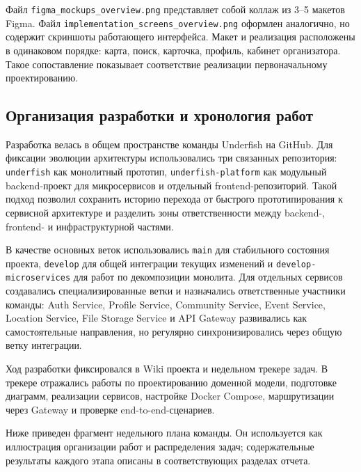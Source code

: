 Файл \nolinkurl{figma_mockups_overview.png} представляет собой коллаж из 3--5 макетов Figma. Файл \nolinkurl{implementation_screens_overview.png} оформлен аналогично, но содержит скриншоты работающего интерфейса. Макет и реализация расположены в одинаковом порядке: карта, поиск, карточка, профиль, кабинет организатора. Такое сопоставление показывает соответствие реализации первоначальному проектированию.



\subsection{Организация разработки и хронология работ}

Разработка велась в общем пространстве команды Underfish на GitHub. Для фиксации эволюции архитектуры использовались три связанных репозитория: \texttt{underfish} как монолитный прототип, \texttt{underfish-platform} как модульный backend-проект для микросервисов и отдельный frontend-репозиторий. Такой подход позволил сохранить историю перехода от быстрого прототипирования к сервисной архитектуре и разделить зоны ответственности между backend-, frontend- и инфраструктурной частями.

В качестве основных веток использовались \texttt{main} для стабильного состояния проекта, \texttt{develop} для общей интеграции текущих изменений и \texttt{develop-microservices} для работ по декомпозиции монолита. Для отдельных сервисов создавались специализированные ветки и назначались ответственные участники команды: Auth Service, Profile Service, Community Service, Event Service, Location Service, File Storage Service и API Gateway развивались как самостоятельные направления, но регулярно синхронизировались через общую ветку интеграции.

Ход разработки фиксировался в Wiki проекта и недельном трекере задач. В трекере отражались работы по проектированию доменной модели, подготовке диаграмм, реализации сервисов, настройке Docker Compose, маршрутизации через Gateway и проверке end-to-end-сценариев.

Ниже приведен фрагмент недельного плана команды. Он используется как иллюстрация организации работ и распределения задач; содержательные результаты каждого этапа описаны в соответствующих разделах отчета.

